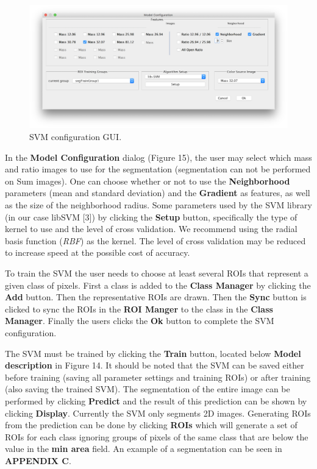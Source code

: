 \documentclass{article}
\begin{document}
	\begin{figure}[ht]
	\centering
	\includegraphics[scale=0.65]{snapshotSegModelConfig.png}
	\caption{SVM configuration GUI.}
	\end{figure} 

	In the \textbf{Model Configuration} dialog (Figure 15),  the user may select which mass and ratio images to use for the segmentation 
	(segmentation can not be performed on Sum images).  One can choose whether or not 
	to use the \textbf{Neighborhood} parameters (mean and standard deviation) and the 
	\textbf{Gradient} as features, as well as the size of the neighborhood radius. 
	Some parameters used by the SVM library (in our case libSVM [3]) by clicking the 
	\textbf{Setup} button, specifically the type of kernel to use and the level of 
	cross validation.  We recommend using the radial basis function (\textit{RBF}) 
	as the kernel.  The level of cross validation may be reduced to increase speed 
	at the possible cost of accuracy.

	To train the SVM the user needs to choose at least several ROIs that represent 
	a given class of pixels. First a class is added to the \textbf{Class Manager} 
	by clicking the \textbf{Add} button.  Then the representative ROIs are drawn.  
	Then the \textbf{Sync} button is clicked to sync the ROIs in the \textbf{ROI Manger} 
	to the class in the \textbf{Class Manager}. Finally the users clicks the \textbf{Ok} 
	button to complete the SVM configuration.


\newpage
	The SVM must be trained by clicking the \textbf{Train} button, located below 
	\textbf{Model description} in Figure 14.  It should be noted that the SVM can 
	be saved either before training (saving all parameter settings and training ROIs) 
	or after training (also saving the trained SVM).  The segmentation of the entire 
	image can be performed by clicking \textbf{Predict} and the result of this 
	prediction can be shown by clicking \textbf{Display}. Currently the SVM only 
	segments 2D images. Generating ROIs from the prediction can be done by clicking 
	\textbf{ROIs} which will generate a set of ROIs for each class ignoring groups 
	of pixels of the same class that are below the value in the \textbf{min area} 
	field. An example of a segmentation can be seen in \textbf{APPENDIX C}.
	
\end{document}

